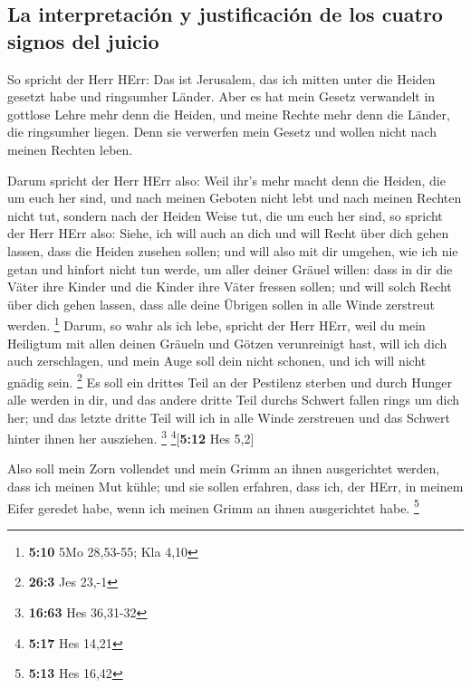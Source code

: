 \hypertarget{la-interpretaciuxf3n-y-justificaciuxf3n-de-los-cuatro-signos-del-juicio}{%
\subsection{La interpretación y justificación de los cuatro signos del
juicio}\label{la-interpretaciuxf3n-y-justificaciuxf3n-de-los-cuatro-signos-del-juicio}}

 So spricht der Herr HErr: Das ist Jerusalem, das ich
mitten unter die Heiden gesetzt habe und ringsumher Länder.
 Aber es hat mein Gesetz verwandelt in gottlose Lehre mehr
denn die Heiden, und meine Rechte mehr denn die Länder, die ringsumher
liegen. Denn sie verwerfen mein Gesetz und wollen nicht nach meinen
Rechten leben.

 Darum spricht der Herr HErr also: Weil ihr's mehr macht
denn die Heiden, die um euch her sind, und nach meinen Geboten nicht
lebt und nach meinen Rechten nicht tut, sondern nach der Heiden Weise
tut, die um euch her sind,  so spricht der Herr HErr also:
Siehe, ich will auch an dich und will Recht über dich gehen lassen, dass
die Heiden zusehen sollen;  und will also mit dir umgehen,
wie ich nie getan und hinfort nicht tun werde, um aller deiner Gräuel
willen:  dass in dir die Väter ihre Kinder und die Kinder
ihre Väter fressen sollen; und will solch Recht über dich gehen lassen,
dass alle deine Übrigen sollen in alle Winde zerstreut werden.
\footnote{\textbf{5:10} 5Mo 28,53-55; Kla 4,10}  Darum,
so wahr als ich lebe, spricht der Herr HErr, weil du mein Heiligtum mit
allen deinen Gräueln und Götzen verunreinigt hast, will ich dich auch
zerschlagen, und mein Auge soll dein nicht schonen, und ich will nicht
gnädig sein. \footnote{\textbf{26:3} Jes 23,-1}  Es soll
ein drittes Teil an der Pestilenz sterben und durch Hunger alle werden
in dir, und das andere dritte Teil durchs Schwert fallen rings um dich
her; und das letzte dritte Teil will ich in alle Winde zerstreuen und
das Schwert hinter ihnen her ausziehen. \footnote{\textbf{16:63} Hes
  36,31-32} \footnote{\textbf{5:17} Hes 14,21}{[}\textbf{5:12} Hes
5,2{]}

 Also soll mein Zorn vollendet und mein Grimm an ihnen
ausgerichtet werden, dass ich meinen Mut kühle; und sie sollen erfahren,
dass ich, der HErr, in meinem Eifer geredet habe, wenn ich meinen Grimm
an ihnen ausgerichtet habe. \footnote{\textbf{5:13} Hes 16,42}

